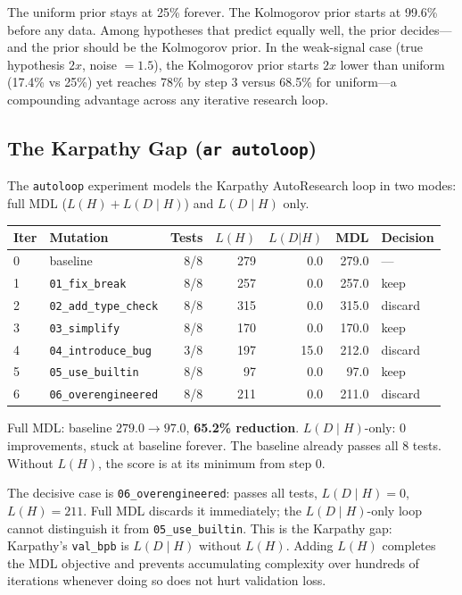 The uniform prior stays at 25\% forever. The Kolmogorov prior starts
at 99.6\% before any data. Among hypotheses that predict equally well,
the prior decides---and the prior should be the Kolmogorov prior. In
the weak-signal case (true hypothesis $2x$, noise $= 1.5$), the
Kolmogorov prior starts $2x$ lower than uniform (17.4\% vs 25\%) yet
reaches 78\% by step 3 versus 68.5\% for uniform---a compounding
advantage across any iterative research loop.

\subsection{The Karpathy Gap (\texttt{ar autoloop})}

The \texttt{autoloop} experiment models the Karpathy AutoResearch loop
in two modes: full MDL ($L(H) + L(D \mid H)$) and $L(D \mid H)$ only.

\begin{center}
\begin{tabular}{llrrrrl}
\toprule
Iter & Mutation & Tests & $L(H)$ & $L(D|H)$ & MDL & Decision \\
\midrule
0 & baseline               & 8/8 & 279 &  0.0 & 279.0 & --- \\
1 & \texttt{01\_fix\_break}        & 8/8 & 257 &  0.0 & 257.0 & keep \\
2 & \texttt{02\_add\_type\_check}  & 8/8 & 315 &  0.0 & 315.0 & discard \\
3 & \texttt{03\_simplify}          & 8/8 & 170 &  0.0 & 170.0 & keep \\
4 & \texttt{04\_introduce\_bug}    & 3/8 & 197 & 15.0 & 212.0 & discard \\
5 & \texttt{05\_use\_builtin}      & 8/8 &  97 &  0.0 &  97.0 & keep \\
6 & \texttt{06\_overengineered}    & 8/8 & 211 &  0.0 & 211.0 & discard \\
\bottomrule
\end{tabular}
\end{center}

Full MDL: baseline $279.0 \to 97.0$, \textbf{65.2\% reduction}.
$L(D \mid H)$-only: 0 improvements, stuck at baseline forever. The
baseline already passes all 8 tests. Without $L(H)$, the score is at
its minimum from step 0.

The decisive case is \texttt{06\_overengineered}: passes all tests,
$L(D \mid H) = 0$, $L(H) = 211$. Full MDL discards it immediately;
the $L(D \mid H)$-only loop cannot distinguish it from
\texttt{05\_use\_builtin}. This is the Karpathy gap: Karpathy's
\texttt{val\_bpb} is $L(D \mid H)$ without $L(H)$. Adding $L(H)$
completes the MDL objective and prevents accumulating complexity over
hundreds of iterations whenever doing so does not hurt validation loss.

